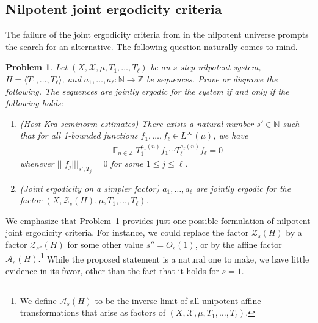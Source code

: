 \documentclass[11pt]{amsart}
\newtheorem{problem}{Problem}
\theoremstyle{definition}
\DeclareMathOperator*{\E}{\mathbb{E}}
\newcommand{\N}{{\mathbb N}}
\newcommand{\Z}{{\mathbb Z}}
\newcommand{\CA}{{\mathcal A}}
\newcommand{\CX}{{\mathcal X}}
\newcommand{\CZ}{{\mathcal Z}}
\newcommand{\nnorm}[1]{\lvert\!|\!| #1|\!|\!\rvert}
\newcommand{\1}{{\mathbf{1}}}
\begin{document}
\subsection{Nilpotent joint ergodicity criteria}

The failure of the joint ergodicity criteria from \cite{BFM22, Fr21, FrKu22a} in the nilpotent universe prompts the search for an alternative. The following question naturally comes to mind.
\begin{problem}\label{Pr: nilpotent joint ergodicity criteria}
    Let $(X, \CX, \mu, T_1, \ldots, T_\ell)$ be an $s$-step nilpotent system, $H=\langle T_1, \ldots, T_\ell\rangle$, and {$a_1, \ldots, a_\ell:\N\to\Z$ be sequences.}
    Prove or disprove the following. 
    The sequences are jointly ergodic for the system if and only if the following holds:
\begin{enumerate}
    \item (Host-Kra seminorm estimates) There exists a natural number $s'\in\N$ such that for all 1-bounded functions $f_1, \ldots, f_\ell\in L^\infty(\mu)$, we have 
    \begin{align*}
        \E_{n\in\Z}T_1^{a_1(n)}f_1\cdots T_\ell^{a_\ell(n)}f_\ell = 0
    \end{align*}
    whenever $\nnorm{f_j}_{s', T_j} = 0$ for some $1\leq j\leq \ell$.
    \item (Joint ergodicity on a simpler factor) $a_1, \ldots, a_\ell$ are jointly ergodic for the factor $(X, \CZ_{s}(H), \mu, T_1, \ldots, T_\ell)$.
\end{enumerate}
\end{problem}

We emphasize that Problem~\ref{Pr: nilpotent joint ergodicity criteria} provides just one possible formulation of nilpotent joint ergodicity criteria. For instance, we could replace the factor $\CZ_s(H)$ by a factor $\CZ_{s''}(H)$ for some other value $s''=O_s(1)$, {or by the affine factor $\CA_s(H)$.\footnote{We define $\CA_s(H)$ to be the inverse limit of all unipotent affine transformations that arise as factors of $(X, \CX, \mu, T_1, \ldots, T_\ell)$.}} While the proposed statement is a natural one to make, we have little evidence in its favor, other than the fact that it holds for $s=1$.
\end{document}
